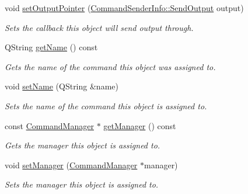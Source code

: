 \begin{DoxyCompactItemize}
void \hyperlink{class_command_sender_info_a992407d10ff184e2aff98798b8c77026}{set\-Output\-Pointer} (\hyperlink{class_command_sender_info_a68c494ef69a25ac7bf667b83e24639ed}{Command\-Sender\-Info\-::\-Send\-Output} output)
\begin{DoxyCompactList}\small\item\em Sets the callback this object will send output through. \end{DoxyCompactList}\item 
Q\-String \hyperlink{class_command_sender_info_a5b8a3d9a7896c03dca35dd886ddcc3de}{get\-Name} () const 
\begin{DoxyCompactList}\small\item\em Gets the name of the command this object was assigned to. \end{DoxyCompactList}\item 
void \hyperlink{class_command_sender_info_a35c1152c2f3da417505af8ebbaa9216b}{set\-Name} (Q\-String \&name)
\begin{DoxyCompactList}\small\item\em Sets the name of the command this object is assigned to. \end{DoxyCompactList}\item 
const \hyperlink{class_command_manager}{Command\-Manager} $\ast$ \hyperlink{class_command_sender_info_a988a7a938308eb6affbb8a16dd992633}{get\-Manager} () const 
\begin{DoxyCompactList}\small\item\em Gets the manager this object is assigned to. \end{DoxyCompactList}\item 
void \hyperlink{class_command_sender_info_a1ae2d9737ba0cf1fc4bad5d73cc5bcfb}{set\-Manager} (\hyperlink{class_command_manager}{Command\-Manager} $\ast$manager)
\begin{DoxyCompactList}\small\item\em Sets the manager this object is assigned to. \end{DoxyCompactList}\end{DoxyCompactItemize}
